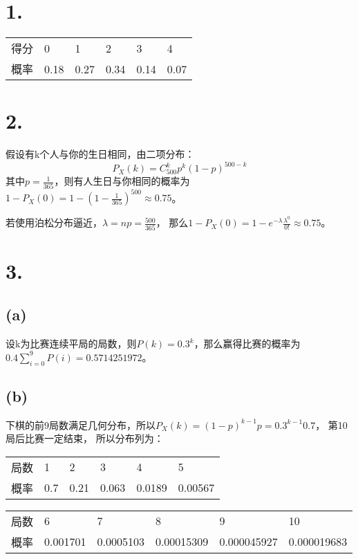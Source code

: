 \documentclass[UTF8]{report}
\begin{document}
    \section*{1.}
        \begin{table}[!htbp]
            \begin{tabular}{llllll}
                得分 & 0 & 1 & 2 & 3 & 4 \\
                概率 & 0.18 & 0.27 & 0.34 & 0.14 & 0.07
            \end{tabular}
        \end{table}
    \section*{2.}
        假设有k个人与你的生日相同，由二项分布：
        $$P_X(k) = C_{500}^kp^k(1 - p)^{500 - k}$$
        其中$p = \frac{1}{365}$，则有人生日与你相同的概率为$1 - P_X(0) = 1 - (1 - \frac{1}{365})^{500} \approx 0.75$。

        若使用泊松分布逼近，$\lambda = np = \frac{500}{365}$，
        那么$1 - P_X(0) = 1 - e^{-\lambda}\frac{\lambda^0}{0!} \approx 0.75$。
    \section*{3.}
        \subsection*{(a)}
            设k为比赛连续平局的局数，则$P(k) = 0.3^k$，那么赢得比赛的概率为$0.4\sum_{i = 0}^9P(i) = 0.5714251972‬$。
        \subsection*{(b)}
            下棋的前9局数满足几何分布，所以$P_X(k) = (1 - p)^{k - 1}p = 0.3^{k - 1}0.7$，
            第10局后比赛一定结束，
            所以分布列为：
            \begin{table}[!htbp]
                \begin{tabular}{llllll}
                    局数 & 1 & 2 & 3 & 4 & 5 \\
                    概率 & 0.7 & 0.21 & 0.063 & 0.0189‬ &
                    0.00567‬
                \end{tabular}
            \end{table}

            \begin{table}[!htbp]
                \begin{tabular}{llllll}
                    局数 & 6 & 7 & 8 & 9 & 10 \\
                    概率 & 0.001701‬ & 0.0005103‬ &
                     0.00015309‬ & 0.000045927‬ & 0.000019683‬
                \end{tabular}
            \end{table}
\end{document}
